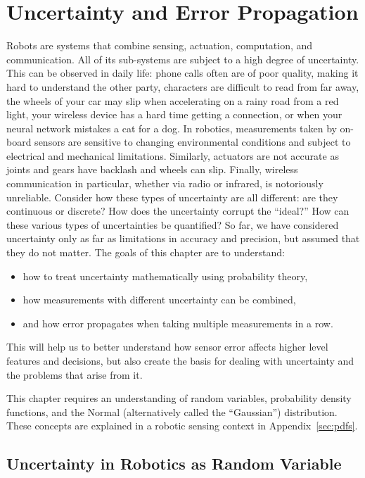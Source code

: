 \chapter{Uncertainty and Error Propagation}\label{chap:uncertainty}

Robots are systems that combine sensing, actuation, computation, and communication. All of its sub-systems are subject to a high degree
of uncertainty. This can be observed in daily life: phone calls often are of poor quality, making it hard to understand the other party,
characters are difficult to read from far away,  the wheels of your car may slip when accelerating on a rainy road from a red light,
your wireless device has a hard time getting a connection, or when your neural network mistakes a cat for a dog. In robotics, measurements
taken by on-board sensors are sensitive to changing environmental conditions and subject to electrical and mechanical limitations.
Similarly, actuators are not accurate as joints and gears have backlash and wheels can slip. Finally, wireless communication in particular,
whether via radio or infrared, is notoriously unreliable. Consider how these types of
uncertainty are all different: are they continuous or discrete? How does the uncertainty corrupt the ``ideal?'' How can these various
types of uncertainties be quantified? So far, we have considered uncertainty only as far as limitations in accuracy and precision, but assumed that they do not matter. The goals of this chapter are to understand:
\begin{itemize}
    \item how to treat uncertainty mathematically using probability theory,
    \item how measurements with different uncertainty can be combined,
    \item and how error propagates when taking multiple measurements in a row.
\end{itemize}

This will help us to better understand how sensor error affects higher level features and decisions, but also create the basis for dealing with uncertainty and the problems that arise from it. 

This chapter requires an understanding of random variables, probability density functions, and the Normal
(alternatively called the ``Gaussian'') distribution. These concepts are explained in a robotic sensing context in Appendix~\ref{sec:pdfs}.

\section{Uncertainty in Robotics as Random Variable}

